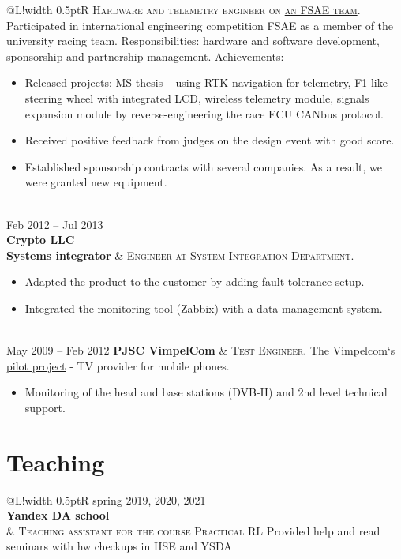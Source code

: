 \documentclass[10pt, a4paper]{extarticle}
\newcommand\boldgrey[1]{\textcolor{mygray}{\textbf{#1}}}
\newcommand\VRule{\color{lightgray}\vrule width 0.5pt}
\begin{document}
\begin{tabular}{@{}L!{\VRule}R}
    {\textsc{Hardware and telemetry engineer on \href{https://baumanracing.ru/en/}{an FSAE team}.}}
    Participated in international engineering competition FSAE as a member of the university racing team.
    Responsibilities: hardware and software development, sponsorship and partnership management.
    Achievements:
    \begin{itemize}
        \item Released projects: MS thesis -- using RTK navigation for telemetry, F1-like steering wheel with integrated LCD, wireless telemetry module, signals expansion module by reverse-engineering the race ECU CANbus protocol.
        \item Received positive feedback from judges on the design event with good score.
        \item Established sponsorship contracts with several companies. As a result, we were granted new equipment.
    \end{itemize}                                                                                              \\
    Feb 2012 -- Jul 2013                                                                                                       \\ {\bf Crypto LLC \\ \boldgrey{Systems integrator}} &
    {\textsc{Engineer at System Integration Department.}}
    \begin{itemize}
        \item Adapted the product to the customer by adding fault tolerance setup.
        \item Integrated the monitoring tool (Zabbix) with a data management system.
    \end{itemize}                                                                                                  \\
    May 2009 -- Feb 2012 {\bf PJSC VimpelCom} &
    {\textsc{Test Engineer.}} The Vimpelcom`s \href{https://www.dvb.org/news/russia-to-launch-dvb-h-services}{pilot project} - TV provider for mobile phones.
    \begin{itemize}
        \item Monitoring of the head and base stations (DVB-H) and 2nd level technical support.
    \end{itemize}
\end{tabular}
% 
% 
\section*{Teaching}
\begin{tabular}{@{}L!{\VRule}R}
    spring 2019, 2020, 2021                                                                                                       \\ {\boldgrey{Yandex DA school}} \\ &
    {\textsc{Teaching assistant for the course Practical RL}} Provided help and read seminars with hw checkups in HSE and YSDA \\
\end{tabular}
\end{document}
